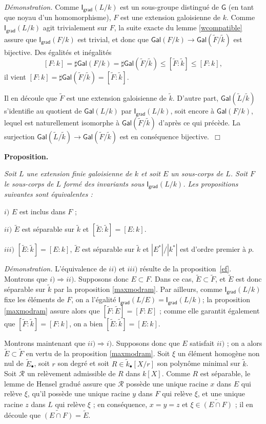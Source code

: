 \documentclass[10pt,leqno]{article}
\renewcommand{\leq}{\leqslant}
\renewcommand{\cal}{\mathscr}
\newcommand{\red}{\widetilde}
\newcommand{\gred}[1]{\widetilde{#1}_{\bullet}}
\newcommand{\deux}[1]{\refstepcounter{subsection}\label{#1}\medskip\noindent {\bf (\thesubsection)}\hspace{.1cm}}
\begin{document}
\medskip
{\em Démonstration.} Comme $\mathsf{I}_{\mathsf {grad}}(L/k)$ est un sous-groupe distingué de $\mathsf G$ (en tant que noyau d'un homomorphisme), $F$ est une extension galoisienne de $k$. Comme $\mathsf{I}_{\mathsf {grad}}(L/k)$ agit trivialement sur $F$, la suite exacte du lemme \ref{wcompatible} assure que $\mathsf{I}_{\mathsf {grad}}(F/k)$ est trivial, et donc que $\mathsf{Gal}(F/k)\to\mathsf{Gal}(\red{F}/\red{k})$ est bijective. Des égalités et inégalités $$[F:k]=\sharp\mathsf{Gal}(F/k)=\sharp\mathsf{Gal}(\red{F}/\red{k})\leq [\red{F}:\red{k}]\leq [F:k],$$ il vient $[F:k]=\sharp\mathsf{Gal}(\red{F}/\red{k})=[\red{F}:\red{k}]$.

\medskip
Il en découle que $\red{F}$ est une extension galoisienne de $\red{k}$. D'autre part, $\mathsf{Gal}({\red{L}/\red{k}})$ s'identifie au quotient de $\mathsf {Gal}(L/k)$ par $\mathsf{I}_{\mathsf {grad}}(L/k)$, soit encore à $\mathsf{Gal}(F/k)$, lequel est naturellement isomorphe à $\mathsf{Gal}(\red{F}/\red{k})$ d'après ce qui précède. La surjection $\mathsf{Gal}(\red{L}/\red{k})\to\mathsf{Gal}(\red{F}/\red{k})$ est en conséquence bijective.~$\Box$ 

\medskip
\deux{extmodram} {\bf Proposition.} {\em Soit $L$ une extension finie galoisienne de $k$ et soit $E$ un sous-corps de $L$. Soit $F$ le sous-corps de $L$ formé des invariants sous $\mathsf{I}_{\mathsf {grad}}(L/k)$. Les propositions suivantes sont équivalentes :

\medskip
$i)$ $E$ est inclus dans $F$ ;

\medskip
$ii)$ $\red{E}$ est séparable sur $\red{k}$ et $[\red{E}:\red{k}]=[E:k]$.

\medskip
$iii)$ $[\red{E}:\red{k}]=[E:k]$, $\red{E}$ est séparable sur $\red{k}$ et $|E^{*}|/|k^{*}|$ est d'ordre premier à $p$.}



\medskip
{\em Démonstration.} L'équivalence de $ii)$ et $iii)$ résulte de la proposition~\ref{ef}. Montrons que $i)\Rightarrow ii)$. Supposons donc $E\subset F$. Dans ce cas, $\red{E}\subset \red{F}$, et $\red{E}$ est donc séparable sur $\red{k}$ par la proposition \ref{maxmodram}. Par ailleurs, comme $\mathsf{I}_{\mathsf {grad}}(L/k)$ fixe les éléments de $F$, on a l'égalité $\mathsf{I}_{\mathsf {grad}}(L/E)=\mathsf{I}_{\mathsf {grad}}(L/k)$; la proposition \ref{maxmodram} assure alors que $[\red{F}:\red{E}]=[F:E]$ ; comme  elle garantit également que $[\red{F}:\red{k}]=[F:k]$, on a bien $[\red{E}:\red{k}]=[E:k]$.

\medskip
Montrons maintenant que $ii)\Rightarrow i)$. Supposons donc que $E$ satisfait $ii)$ ; on a alors $\red E\subset \red F$ en vertu de la proposition \ref{maxmodram}. Soit $\xi$ un élément homogène non nul de $\gred{E}$, soit $r$ son degré et soit $R\in \gred{k}[X/r]$ son polynôme minimal sur $\red{k}$. Soit $\cal R$ un relèvement admissible de $R$ dans $k[X]$. Comme $R$ est séparable, le lemme de Hensel gradué assure que ${\cal R}$ possède une unique racine $x$ dans $E$ qui relève $\xi$, qu'il possède une unique racine $y$ dans $F$ qui relève $\xi$, et une unique racine $z$ dans $L$ qui relève $\xi$ ; en conséquence, $x=y=z$ et $\xi \in \red{(E\cap F)}$ ; il en découle que $\red{(E\cap F)}=\red{E}$.
\end{document}
